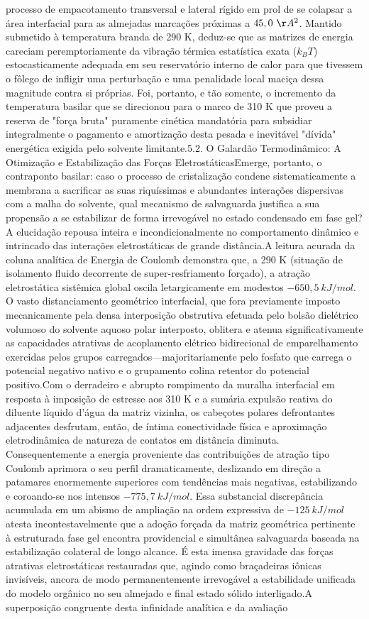 processo de empacotamento transversal e lateral rígido em prol de se colapsar a área interfacial para as almejadas marcações próximas a $45,0~\AA^2$. Mantido submetido à temperatura branda de 290 K, deduz-se que as matrizes de energia careciam peremptoriamente da vibração térmica estatística exata ($k_B T$) estocasticamente adequada em seu reservatório interno de calor para que tivessem o fôlego de infligir uma perturbação e uma penalidade local maciça dessa magnitude contra si próprias. Foi, portanto, e tão somente, o incremento da temperatura basilar que se direcionou para o marco de 310 K que proveu a reserva de "força bruta" puramente cinética mandatória para subsidiar integralmente o pagamento e amortização desta pesada e inevitável "dívida" energética exigida pelo solvente limitante.5.2. O Galardão Termodinâmico: A Otimização e Estabilização das Forças EletrostáticasEmerge, portanto, o contraponto basilar: caso o processo de cristalização condene sistematicamente a membrana a sacrificar as suas riquíssimas e abundantes interações dispersivas com a malha do solvente, qual mecanismo de salvaguarda justifica a sua propensão a se estabilizar de forma irrevogável no estado condensado em fase gel? A elucidação repousa inteira e incondicionalmente no comportamento dinâmico e intrincado das interações eletrostáticas de grande distância.A leitura acurada da coluna analítica de Energia de Coulomb demonstra que, a 290 K (situação de isolamento fluido decorrente de super-resfriamento forçado), a atração eletrostática sistêmica global oscila letargicamente em modestos $-650,5~kJ/mol$. O vasto distanciamento geométrico interfacial, que fora previamente imposto mecanicamente pela densa interposição obstrutiva efetuada pelo bolsão dielétrico volumoso do solvente aquoso polar interposto, oblitera e atenua significativamente as capacidades atrativas de acoplamento elétrico bidirecional de emparelhamento exercidas pelos grupos carregados—majoritariamente pelo fosfato que carrega o potencial negativo nativo e o grupamento colina retentor do potencial positivo.Com o derradeiro e abrupto rompimento da muralha interfacial em resposta à imposição de estresse aos 310 K e a sumária expulsão reativa do diluente líquido d'água da matriz vizinha, os cabeçotes polares defrontantes adjacentes desfrutam, então, de íntima conectividade física e aproximação eletrodinâmica de natureza de contatos em distância diminuta. Consequentemente a energia proveniente das contribuições de atração tipo Coulomb aprimora o seu perfil dramaticamente, deslizando em direção a patamares enormemente superiores com tendências mais negativas, estabilizando e coroando-se nos intensos $-775,7~kJ/mol$. Essa substancial discrepância acumulada em um abismo de ampliação na ordem expressiva de $-125~kJ/mol$ atesta incontestavelmente que a adoção forçada da matriz geométrica pertinente à estruturada fase gel encontra providencial e simultânea salvaguarda baseada na estabilização colateral de longo alcance. É esta imensa gravidade das forças atrativas eletrostáticas restauradas que, agindo como braçadeiras iônicas invisíveis, ancora de modo permanentemente irrevogável a estabilidade unificada do modelo orgânico no seu almejado e final estado sólido interligado.A superposição congruente desta infinidade analítica e da avaliação 